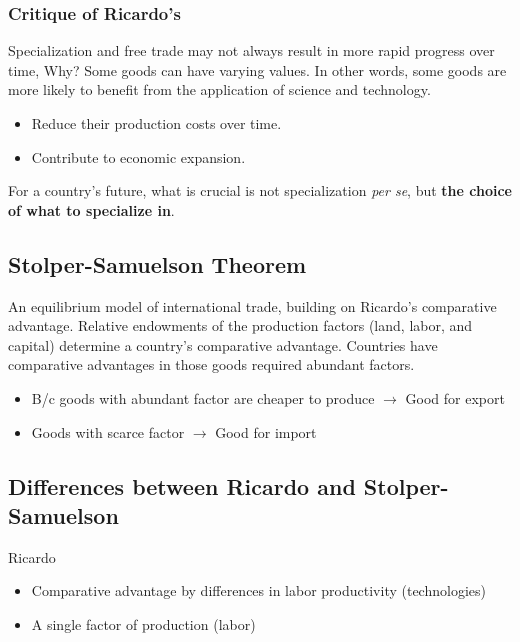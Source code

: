 \documentclass[
]{book}
\begin{document}
\hypertarget{critique-of-ricardos}{%
\subsubsection{Critique of Ricardo's}\label{critique-of-ricardos}}

Specialization and free trade may not always result in more rapid progress over time, Why? Some goods can have varying values. In other words, some goods are more likely to benefit from the application of science and technology.

\begin{itemize}
\item
  Reduce their production costs over time.
\item
  Contribute to economic expansion.
\end{itemize}

For a country's future, what is crucial is not specialization \emph{per se}, but \textbf{the choice of what to specialize in}.

\hypertarget{stolper-samuelson-theorem}{%
\subsection{Stolper-Samuelson Theorem}\label{stolper-samuelson-theorem}}

An equilibrium model of international trade, building on Ricardo's comparative advantage. Relative endowments of the production factors (land, labor, and capital) determine a country's comparative advantage. Countries have comparative advantages in those goods required abundant factors.

\begin{itemize}
\item
  B/c goods with abundant factor are cheaper to produce \(\rightarrow\) Good for export
\item
  Goods with scarce factor \(\rightarrow\) Good for import
\end{itemize}

\hypertarget{differences-between-ricardo-and-stolper-samuelson}{%
\subsection{Differences between Ricardo and Stolper-Samuelson}\label{differences-between-ricardo-and-stolper-samuelson}}

Ricardo

\begin{itemize}
\item
  Comparative advantage by differences in labor productivity (technologies)
\item
  A single factor of production (labor)
\end{itemize}
\end{document}
